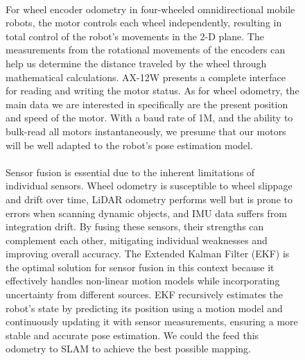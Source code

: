 \begin{figure} [H]
\paragraph*{}
For wheel encoder odometry in four-wheeled omnidirectional mobile robots, the motor controls each wheel independently, resulting in total control of the robot's movements in the 2-D plane. The measurements from the rotational movements of the encoders can help us determine the distance traveled by the wheel through mathematical calculations.
AX-12W presents a complete interface for reading and writing the motor status. As for wheel odometry, the main data we are interested in specifically are the present position and speed of the motor. With a baud rate of 1M, and the ability to bulk-read all motors instantaneously, we presume that our motors will be well adapted to the robot's pose estimation model. \cite{phunopas2018motion}

\paragraph*{}
Sensor fusion is essential due to the inherent limitations of individual sensors. Wheel odometry is susceptible to wheel slippage and drift over time, LiDAR odometry performs well but is prone to errors when scanning dynamic objects, and IMU data suffers from integration drift. By fusing these sensors, their strengths can complement each other, mitigating individual weaknesses and improving overall accuracy. The Extended Kalman Filter (EKF) is the optimal solution for sensor fusion in this context because it effectively handles non-linear motion models while incorporating uncertainty from different sources. EKF recursively estimates the robot’s state by predicting its position using a motion model and continuously updating it with sensor measurements, ensuring a more stable and accurate pose estimation. We could the feed this odometry to SLAM to achieve the best possible mapping.

\end{figure}
